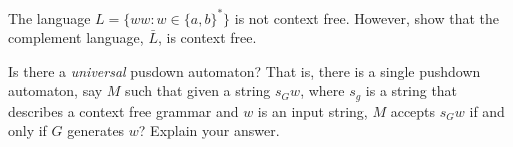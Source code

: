 \documentclass[12pt]{exam}
\begin{document}
\begin{questions}
  \question{}
  The language $L=\{ww: w\in \{a,b\}^{*}\}$ is not context free. However, show that the complement language, $\bar{L}$, is context free.

  \question{}
  Is there a \emph{universal} pusdown automaton? That is, there is a single pushdown automaton, say $M$ such that given a string $s_{G}w$, where $s_{g}$ is a string that describes a context free grammar and $w$ is an input string, $M$ accepts $s_{G}w$ if and only if $G$ generates $w$? Explain your answer.
\end{questions}
\end{document}
